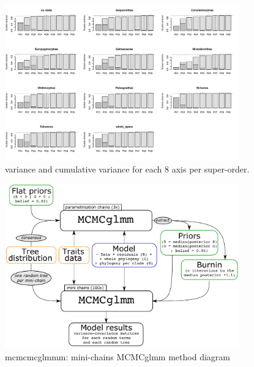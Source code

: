 \documentclass[12pt,letterpaper]{article}
\begin{document}
\begin{figure}[!htbp]
\centering
   \includegraphics[width=0.9\textwidth]{Figures/axis_selection.pdf}
\caption{variance and cumulative variance for each 8 axis per super-order.}
\label{Fig:axes_variance}
\end{figure}


\begin{figure}[!htbp]
\centering
   \includegraphics[width=0.9\textwidth]{Figures/mini-chains_diagram.pdf}
\caption{mcmcmcglmmm: mini-chains MCMCglmm method diagram}
\label{Fig:fig_mcmcmcglmm}
\end{figure}
\end{document}

